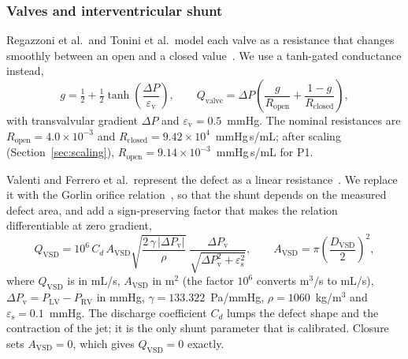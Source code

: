 \FloatBarrier
\subsubsection{Valves and interventricular shunt}
\label{sec:valves}
Regazzoni et al.\ and Tonini et al.\ model each valve as a resistance that changes smoothly between an open and a closed value~\cite{Regazzoni2022,Tonini2025}. We use a tanh-gated conductance instead,
\begin{equation}
g = \tfrac{1}{2} + \tfrac{1}{2}\tanh\!\left(\frac{\Delta P}{\varepsilon_{\mathrm{v}}}\right), \qquad
Q_{\mathrm{valve}} = \Delta P\left(\frac{g}{R_{\mathrm{open}}} + \frac{1-g}{R_{\mathrm{closed}}}\right),
\label{eq:valve}
\end{equation}
with transvalvular gradient $\Delta P$ and $\varepsilon_{\mathrm{v}} = 0.5$~mmHg. The nominal resistances are $R_{\mathrm{open}} = 4.0\times10^{-3}$ and $R_{\mathrm{closed}} = 9.42\times10^{4}$~mmHg\,s/mL; after scaling (Section~\ref{sec:scaling}), $R_{\mathrm{open}} = 9.14\times10^{-3}$~mmHg\,s/mL for P1.

Valenti and Ferrero et al.\ represent the defect as a linear resistance~\cite{Valenti2023,Ferrero2026Shunts}. We replace it with the Gorlin orifice relation~\cite{Gorlin1951}, so that the shunt depends on the measured defect area, and add a sign-preserving factor that makes the relation differentiable at zero gradient,
\begin{equation}
Q_{\mathrm{VSD}} = 10^{6}\, C_d\, A_{\mathrm{VSD}} \sqrt{\frac{2\,\gamma\,\lvert\Delta P_{\mathrm{v}}\rvert}{\rho}}\;
\frac{\Delta P_{\mathrm{v}}}{\sqrt{\Delta P_{\mathrm{v}}^{2} + \varepsilon_{\mathrm{s}}^{2}}},
\qquad A_{\mathrm{VSD}} = \pi\left(\frac{D_{\mathrm{VSD}}}{2}\right)^{2},
\label{eq:orifice}
\end{equation}
where $Q_{\mathrm{VSD}}$ is in mL/s, $A_{\mathrm{VSD}}$ in m$^2$ (the factor $10^{6}$ converts m$^3$/s to mL/s), $\Delta P_{\mathrm{v}} = P_{\mathrm{LV}} - P_{\mathrm{RV}}$ in mmHg, $\gamma = 133.322$~Pa/mmHg, $\rho = 1060$~kg/m$^3$ and $\varepsilon_{\mathrm{s}} = 0.1$~mmHg. The discharge coefficient $C_d$ lumps the defect shape and the contraction of the jet; it is the only shunt parameter that is calibrated. Closure sets $A_{\mathrm{VSD}} = 0$, which gives $Q_{\mathrm{VSD}} = 0$ exactly.

